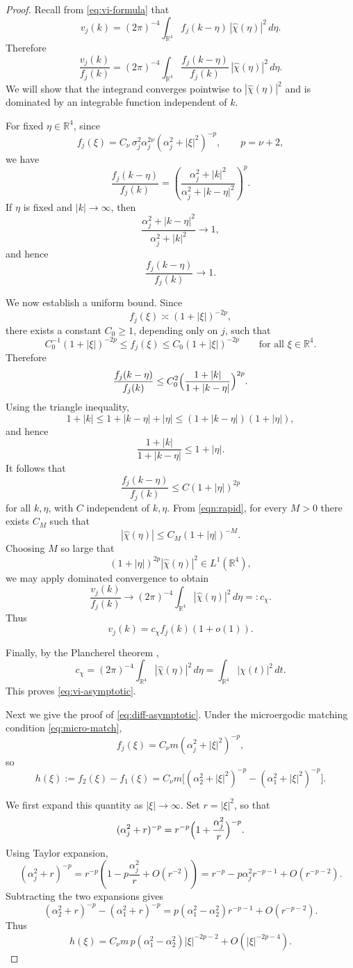 \documentclass[11pt, reqno]{amsart}
\theoremstyle{remark}
\newcommand{\R}{\mathbb{R}}
\newcommand{\1}{\mathbf{1}}
\begin{document}
\begin{proof}
Recall from \eqref{eq:vi-formula} that
\[
v_j(k)
=
(2\pi)^{-4}\int_{\R^4} f_j(k-\eta)\,|\widehat{\chi}(\eta)|^2\,d\eta.
\]
Therefore
\[
\frac{v_j(k)}{f_j(k)}
=
(2\pi)^{-4}\int_{\R^4}\frac{f_j(k-\eta)}{f_j(k)}\,|\widehat{\chi}(\eta)|^2\,d\eta.
\]
We will show that the integrand converges pointwise to $|\widehat{\chi}(\eta)|^2$
and is dominated by an integrable function independent of $k$.

For fixed $\eta\in\R^4$, since
\[
f_j(\xi)=C_\nu\,\sigma_j^2\alpha_j^{2\nu}(\alpha_j^2+|\xi|^2)^{-p},
\qquad p=\nu+2,
\]
we have
\[
\frac{f_j(k-\eta)}{f_j(k)}
=
\left(\frac{\alpha_j^2+|k|^2}{\alpha_j^2+|k-\eta|^2}\right)^p.
\]
If $\eta$ is fixed and $|k|\to\infty$, then
\[
\frac{\alpha_j^2+|k-\eta|^2}{\alpha_j^2+|k|^2}\to 1,
\]
and hence
\[
\frac{f_j(k-\eta)}{f_j(k)}\to 1.
\]

We now establish a uniform bound. Since
\[
f_j(\xi)\asymp (1+|\xi|)^{-2p},
\]
there exists a constant $C_0\ge 1$, depending only on $j$, such that
\[
C_0^{-1}(1+|\xi|)^{-2p}\le f_j(\xi)\le C_0(1+|\xi|)^{-2p}
\qquad\text{for all }\xi\in\R^4.
\]
Therefore
\[
\frac{f_j(k-\eta)}{f_j(k)}
\le
C_0^2\Bigl(\frac{1+|k|}{1+|k-\eta|}\Bigr)^{2p}.
\]
Using the triangle inequality,
\[
1+|k|\le 1+|k-\eta|+|\eta|
\le (1+|k-\eta|)(1+|\eta|),
\]
and hence
\[
\frac{1+|k|}{1+|k-\eta|}
\le 1+|\eta|.
\]
It follows that
\[
\frac{f_j(k-\eta)}{f_j(k)}
\le C(1+|\eta|)^{2p}
\]
for all $k,\eta$, with $C$ independent of $k,\eta$.
From \eqref{eqn:rapid}, for every $M>0$ there exists $C_M$ such that
\[
|\widehat{\chi}(\eta)|\le C_M(1+|\eta|)^{-M}.
\]
Choosing $M$ so large that
\[
(1+|\eta|)^{2p}|\widehat{\chi}(\eta)|^2\in L^1(\R^4),
\]
we may apply dominated convergence to obtain
\[
\frac{v_j(k)}{f_j(k)}
\to
(2\pi)^{-4}\int_{\R^4}|\widehat{\chi}(\eta)|^2\,d\eta
=:c_\chi.
\]
Thus
\[
v_j(k)=c_\chi f_j(k)(1+o(1)).
\]

Finally, by the Plancherel theorem \cite[p.15]{duo2024fourier},
\[
c_\chi=(2\pi)^{-4}\int_{\R^4}|\widehat{\chi}(\eta)|^2\,d\eta
=\int_{\R^4}|\chi(t)|^2\,dt.
\]
This proves \eqref{eq:vi-asymptotic}.

\medskip
\noindent
Next we give the proof of \eqref{eq:diff-asymptotic}.
Under the microergodic matching condition \eqref{eq:micro-match},
\[
f_j(\xi)=C_\nu m(\alpha_j^2+|\xi|^2)^{-p},
\]
so
\[
h(\xi):=f_2(\xi)-f_1(\xi)
=
C_\nu m\Big[(\alpha_2^2+|\xi|^2)^{-p}-(\alpha_1^2+|\xi|^2)^{-p}\Big].
\]

We first expand this quantity as $|\xi|\to\infty$. Set $r=|\xi|^2$, so that
\[
(\alpha_j^2+r)^{-p}=r^{-p}\Bigl(1+\frac{\alpha_j^2}{r}\Bigr)^{-p}.
\]
Using Taylor expansion,
\[
(\alpha_j^2+r)^{-p}
=
r^{-p}\left(1-p\frac{\alpha_j^2}{r}+O(r^{-2})\right)
=
r^{-p}-p\alpha_j^2 r^{-p-1}+O(r^{-p-2}).
\]
Subtracting the two expansions gives
\[
(\alpha_2^2+r)^{-p}-(\alpha_1^2+r)^{-p}
=
p(\alpha_1^2-\alpha_2^2)r^{-p-1}+O(r^{-p-2}).
\]
Thus
\begin{equation}\label{eq:h-expansion-detailed}
h(\xi)
=
C_\nu m\,p(\alpha_1^2-\alpha_2^2)|\xi|^{-2p-2}
+
O(|\xi|^{-2p-4}).
\end{equation}


\end{proof}
\end{document}
